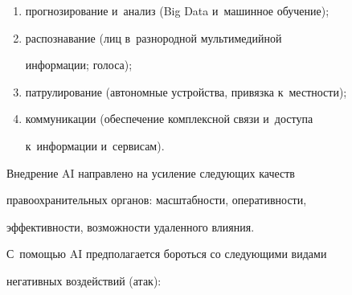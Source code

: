   \begin{enumerate}[(1)]


\item прогнозирование и~анализ (Big Data и~машинное обучение);


\item распознавание (лиц в~разнородной мультимедийной


информации; голоса);


\item патрулирование (автономные устройства, привязка к~мест\-ности);


\item коммуникации (обеспечение комплексной связи и~доступа


к~информации и~сервисам).


  \end{enumerate}





  Внедрение AI направлено на усиление следующих качеств


правоохранительных органов: масштабности, оперативности,


эффективности, возможности удаленного влияния.





  С~помощью AI предполагается бороться со следующими видами


негативных воздействий (атак):


